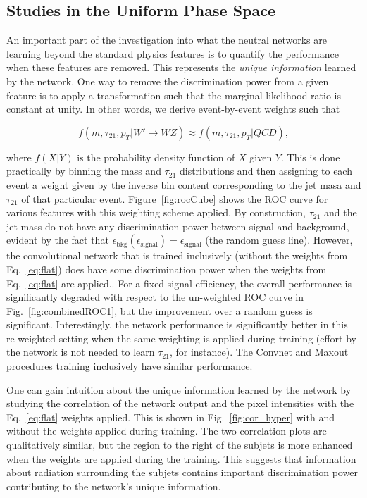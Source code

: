 \subsection{Studies in the Uniform Phase Space} %
\label{sub:flat_hypercube_studies}

An important part of the investigation into what the neutral networks are learning beyond the standard physics features is to quantify the performance when these features are removed.  This represents the {\it unique information} learned by the network.  One way to remove the discrimination power from a given feature is to apply a transformation such that the marginal likelihood ratio is constant at unity.  In other words, we derive event-by-event weights such that

\begin{equation}
\label{eq:flat}
  f(m, \tau_{21}, p_T| W'\rightarrow WZ) \approx f(m, \tau_{21}, p_T| QCD),
\end{equation}

\noindent where $f(X|Y)$ is the probability density function of $X$ given $Y$.  This is done practically by binning the mass and $\tau_{21}$ distributions and then assigning to each event a weight given by the inverse bin content corresponding to the jet masa and $\tau_{21}$ of that particular event. Figure~\ref{fig:rocCube} shows the ROC curve for various features with this weighting scheme applied.  By construction, $\tau_{21}$ and the jet mass do not have any discrimination power between signal and background, evident by the fact that $\epsilon_\text{bkg}(\epsilon_\text{signal})=\epsilon_\text{signal}$ (the random guess line).    However, the convolutional network that is trained inclusively (without the weights from Eq.~\ref{eq:flat}) does have some discrimination power when the weights from Eq.~\ref{eq:flat} are applied..  For a fixed signal efficiency, the overall performance is significantly degraded with respect to the un-weighted ROC curve in Fig.~\ref{fig:combinedROC1}, but the improvement over a random guess is significant.  Interestingly, the network performance is significantly better in this re-weighted setting when the same weighting is applied during training (effort by the network is not needed to learn $\tau_{21}$, for instance).  The Convnet and Maxout procedures training inclusively have similar performance.

One can gain intuition about the unique information learned by the network by studying the correlation of the network output and the pixel intensities with the Eq.~\ref{eq:flat} weights applied.  This is shown in Fig.~\ref{fig:cor_hyper} with and without the weights applied during training.  The two correlation plots are qualitatively similar, but the region to the right of the subjets is more enhanced when the weights are applied during the training.  This suggests that information about radiation surrounding the subjets contains important discrimination power contributing to the network's unique information.

